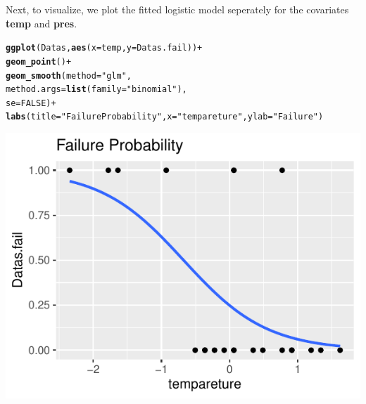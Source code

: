 \documentclass[11pt,english]{article}\usepackage[]{graphicx}\usepackage[]{xcolor}
\makeatletter
\def\maxwidth{ %
  \ifdim\Gin@nat@width>\linewidth
    \linewidth
  \else
    \Gin@nat@width
  \fi
}
\newcommand{\hlnum}[1]{\textcolor[rgb]{0.686,0.059,0.569}{#1}}%
\newcommand{\hlstr}[1]{\textcolor[rgb]{0.192,0.494,0.8}{#1}}%
\newcommand{\hlopt}[1]{\textcolor[rgb]{0,0,0}{#1}}%
\newcommand{\hlstd}[1]{\textcolor[rgb]{0.345,0.345,0.345}{#1}}%
\newcommand{\hlkwc}[1]{\textcolor[rgb]{0.333,0.667,0.333}{#1}}%
\newcommand{\hlkwd}[1]{\textcolor[rgb]{0.737,0.353,0.396}{\textbf{#1}}}%
\newenvironment{kframe}{%
 \def\at@end@of@kframe{}%
 \ifinner\ifhmode%
  \def\at@end@of@kframe{\end{minipage}}%
  \begin{minipage}{\columnwidth}%
 \fi\fi%
 \def\FrameCommand##1{\hskip\@totalleftmargin \hskip-\fboxsep
 \colorbox{shadecolor}{##1}\hskip-\fboxsep
     \hskip-\linewidth \hskip-\@totalleftmargin \hskip\columnwidth}%
 \MakeFramed {\advance\hsize-\width
   \@totalleftmargin\z@ \linewidth\hsize
   \@setminipage}}%
 {\par\unskip\endMakeFramed%
 \at@end@of@kframe}
\newenvironment{knitrout}{}{} %
\makeatother
\begin{document}
Next, to visualize, we plot the fitted logistic model seperately for
the covariates \textbf{temp }and \textbf{pres}.
\begin{center}
\begin{knitrout}
\color{fgcolor}\begin{kframe}
\begin{alltt}
\hlkwd{ggplot}\hlstd{( Datas,} \hlkwd{aes}\hlstd{(}\hlkwc{x}\hlstd{=temp,} \hlkwc{y}\hlstd{=Datas.fail))} \hlopt{+}
  \hlkwd{geom_point}\hlstd{()} \hlopt{+}
  \hlkwd{geom_smooth}\hlstd{(}\hlkwc{method} \hlstd{=} \hlstr{"glm"}\hlstd{,}
              \hlkwc{method.args} \hlstd{=} \hlkwd{list}\hlstd{(}\hlkwc{family} \hlstd{=} \hlstr{"binomial"}\hlstd{),}
              \hlkwc{se} \hlstd{=} \hlnum{FALSE}\hlstd{)} \hlopt{+}
\hlkwd{labs}\hlstd{(}\hlkwc{title} \hlstd{=} \hlstr{"Failure Probability"}\hlstd{,}\hlkwc{x} \hlstd{=} \hlstr{"tempareture"}\hlstd{,}\hlkwc{ylab} \hlstd{=} \hlstr{"Failure"}\hlstd{)}
\end{alltt}
\end{kframe}
\includegraphics[width=\maxwidth]{figure/unnamed-chunk-4-1} 
\end{knitrout}
\par\end{center}
\end{document}
